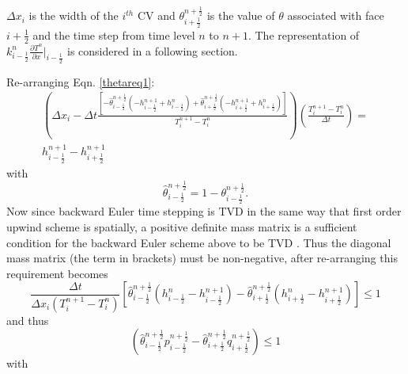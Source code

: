 \noindent
$\Delta x_{i}$ is the width of the $i^{th}$ CV and $\theta_{i+\frac{1}{2}}^{n+\frac{1}{2}}$ is the value of $\theta$ associated with face $i+\frac{1}{2}$ and the time step from time level $n$ to $n+1$.  The representation of $k_{i-\frac{1}{2}}^n \frac{\partial T^n}{\partial x}\vert_{i-\frac{1}{2}}$ is considered in a following section.%

Re-arranging Eqn. \ref{thetareq1}:
\begin{eqnarray}
\left( \Delta x_i - \Delta t \frac{\left[
-\widehat{\theta}_{i-\frac{1}{2}}^{n+\frac{1}{2}}(
-h_{i-\frac{1}{2}}^{n+1}+h_{i-\frac{1}{2}}^{n})
+\widehat{\theta}_{i+\frac{1}{2}}^{n+\frac{1}{2}}(
-h_{i+\frac{1}{2}}^{n+1}+h_{i+\frac{1}{2}}^{n}) \right]}
{T_i^{n+1}-T_i^n} \right)
\left(\frac{T_i^{n+1} - T_i^n}{\Delta t} \right) =\nonumber\\
h_{i-\frac{1}{2}}^{n+1}-h_{i+\frac{1}{2}}^{n+1}\nonumber
\end{eqnarray}
with
\begin{displaymath}
\widehat{\theta}_{i-\frac{1}{2}}^{n+\frac{1}{2}}  = 1-\theta_{i-\frac{1}{2}}^{n+\frac{1}{2}}.
\end{displaymath}
Now since backward Euler time stepping is TVD in the same way that first order upwind scheme is spatially, a positive definite mass matrix is a sufficient condition for the backward Euler scheme above to be TVD \citep[see][]{hirsch_1990}.  Thus the diagonal mass matrix (the term in brackets) must be non-negative, after re-arranging this requirement becomes
\begin{displaymath}
\frac{\Delta t}{\Delta x_{i}\left(T_i^{n+1} - T_i^{n}\right)} \left[ \widehat{\theta}_{i-\frac{1}{2}}^{n+\frac{1}{2}}\left(h_{i-\frac{1}{2}}^{n} - h_{i-\frac{1}{2}}^{n+1}\right)-\hat\theta_{i+\frac{1}{2}}^{n+\frac{1}{2}}\left(h_{i+\frac{1}{2}}^{n}-h_{i+\frac{1}{2}}^{n+1}\right) \right] \leq 1
\end{displaymath}
and thus
\begin{displaymath}
\left(\widehat{\theta}_{i-\frac{1}{2}}^{n+\frac{1}{2}}
p_{i-\frac{1}{2}}^{n+\frac{1}{2}}
-\widehat{\theta}_{i+\frac{1}{2}}^{n+\frac{1}{2}}
q_{i+\frac{1}{2}}^{n+\frac{1}{2}} \right) \leq 1
\end{displaymath}
with
